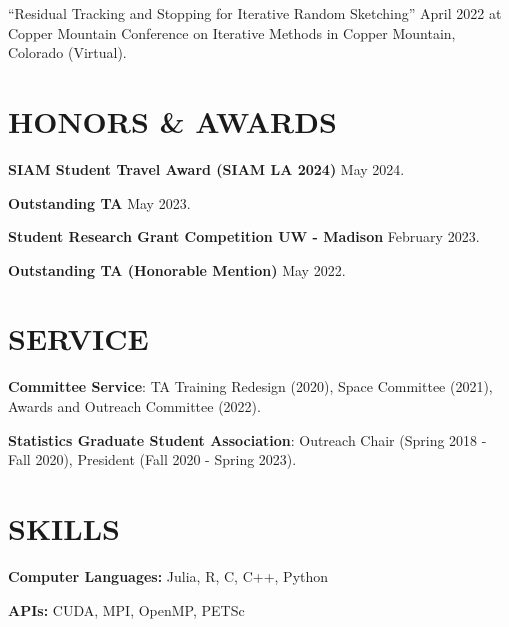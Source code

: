 \documentclass[margin,11pt]{res}
\begin{document}
\begin{resume}
``Residual Tracking and Stopping for Iterative Random Sketching'' April 2022 at Copper Mountain Conference on Iterative Methods in Copper Mountain, Colorado (Virtual).




\section{HONORS \& AWARDS} 
{\bf SIAM Student Travel Award (SIAM LA 2024)} \hfill May 2024.

{\bf Outstanding TA} \hfill May 2023.

{\bf Student Research Grant Competition UW - Madison} \hfill February 2023.

{\bf Outstanding TA (Honorable Mention)} \hfill May 2022.

\section{SERVICE}

\textbf{Committee Service}: TA Training Redesign (2020), Space Committee (2021), Awards and Outreach Committee (2022).

\textbf{Statistics Graduate Student Association}: Outreach Chair (Spring 2018 - Fall 2020), President (Fall 2020 - Spring 2023). 

\section{SKILLS}
\textbf{Computer Languages:} Julia, R, C, C++, Python

\textbf{APIs:} CUDA, MPI, OpenMP, PETSc

\end{resume}
\end{document}

